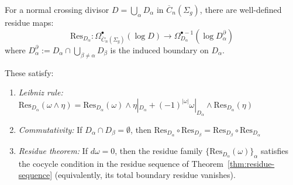 \begin{theorem}\label{thm:residue-operations}
For a normal crossing divisor $D = \bigcup_\alpha D_\alpha$ in $\overline{C}_n(\Sigma_g)$, there are well-defined residue maps:
\[\text{Res}_{D_\alpha}: \Omega^{\bullet}_{\overline{C}_n(\Sigma_g)}(\log D) \to \Omega^{\bullet-1}_{D_\alpha}(\log D_\alpha^\partial)\]
where $D_\alpha^\partial := D_\alpha \cap \bigcup_{\beta\neq\alpha} D_\beta$ is the induced boundary on $D_\alpha$.

These satisfy:
\begin{enumerate}
\item \emph{Leibniz rule:} $\text{Res}_{D_\alpha}(\omega \wedge \eta) = \text{Res}_{D_\alpha}(\omega) \wedge \eta|_{D_\alpha} + (-1)^{|\omega|}\omega|_{D_\alpha} \wedge \text{Res}_{D_\alpha}(\eta)$
\item \emph{Commutativity:} If $D_\alpha \cap D_\beta = \emptyset$, then $\text{Res}_{D_\alpha} \circ \text{Res}_{D_\beta} = \text{Res}_{D_\beta} \circ \text{Res}_{D_\alpha}$
\item \emph{Residue theorem:} If $d\omega=0$, then the residue family $\{\text{Res}_{D_\alpha}(\omega)\}_\alpha$ satisfies the cocycle condition in the residue sequence of Theorem~\ref{thm:residue-sequence} (equivalently, its total boundary residue vanishes).
\end{enumerate}
\end{theorem}

